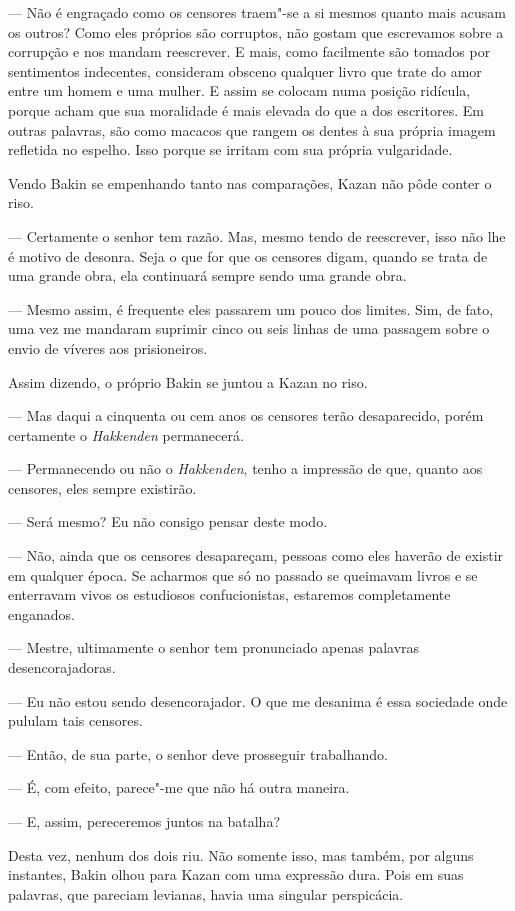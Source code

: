 --- Não é engraçado como os censores traem"-se a si mesmos quanto mais
acusam os outros? Como eles próprios são corruptos, não gostam que
escrevamos sobre a corrupção e nos mandam reescrever. E mais, como
facilmente são tomados por sentimentos indecentes, consideram obsceno
qualquer livro que trate do amor entre um homem e uma mulher. E assim
se colocam numa posição ridícula, porque acham que sua moralidade é
mais elevada do que a dos escritores. Em outras palavras, são como
macacos que rangem os dentes à sua própria imagem refletida no espelho.
Isso porque se irritam com sua própria vulgaridade.

Vendo Bakin se empenhando tanto nas comparações, Kazan não pôde conter o
riso.

--- Certamente o senhor tem razão. Mas, mesmo tendo de reescrever, isso
não lhe é motivo de desonra. Seja o que for que os censores digam, 
quando se trata de uma grande obra, ela continuará sempre sendo uma
grande obra.

--- Mesmo assim, é frequente eles passarem um pouco dos limites. Sim, de
fato, uma vez me mandaram suprimir cinco ou seis linhas de uma passagem
sobre o envio de víveres aos prisioneiros.

Assim dizendo, o próprio Bakin se juntou a Kazan no riso.

--- Mas daqui a cinquenta ou cem anos os censores terão desaparecido,
porém certamente o \textit{Hakkenden} permanecerá.

--- Permanecendo ou não o \textit{Hakkenden}, tenho a impressão de que,
quanto aos censores, eles sempre existirão.

--- Será mesmo? Eu não consigo pensar deste modo.

--- Não, ainda que os censores desapareçam, pessoas como eles haverão de
existir em qualquer época. Se acharmos que só no passado se queimavam
livros e se enterravam vivos os estudiosos confucionistas, estaremos
completamente enganados.

--- Mestre, ultimamente o senhor tem pronunciado apenas palavras
desencorajadoras.

--- Eu não estou sendo desencorajador. O que me desanima é essa sociedade
onde pululam tais censores.

--- Então, de sua parte, o senhor deve prosseguir trabalhando.

--- É, com efeito, parece"-me que não há outra maneira.

--- E, assim, pereceremos juntos na batalha?

Desta vez, nenhum dos dois riu. Não somente isso, mas também, por alguns
instantes, Bakin olhou para Kazan com uma expressão dura. Pois em suas
palavras, que pareciam levianas, havia uma singular perspicácia.

